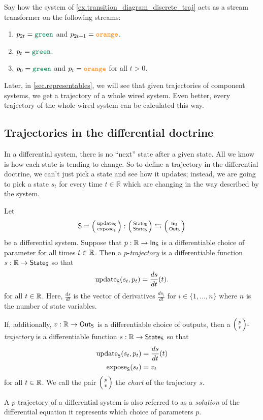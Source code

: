 \documentclass[DynamicalBook]{subfiles}
\begin{document}
\begin{exercise}
 Say how the system of \cref{ex.transition_diagram_discrete_traj} acts as a
 stream transformer on the following streams:
 \begin{enumerate}
   \item $p_{2t} = \Green$ and $p_{2t + 1} = {\color{orange} \mathtt{orange}}$.
   \item $p_t = \Green$.
   \item $p_0 = \Green$ and $p_t = {\color{orange} \mathtt{orange}}$ for
     all $t > 0$.
     \qedhere
 \end{enumerate}
\end{exercise}

Later, in \cref{sec.representables}, we will see that given trajectories of
component systems, we get a trajectory of a whole wired system. Even better,
every trajectory of the whole wired system can be calculated this way.

\subsection{Trajectories in the differential doctrine}\label{sec.trajectory_differential}

In a differential system, there is no ``next'' state after a given state. All we
know is how each state is tending to change. So to define a trajectory in the
differential doctrine, we can't just pick a state and see how it updates;
instead, we are going to pick a state $s_t$ for every time $t \in \mathbb{R}$
which are changing in the way described by the system. 

\begin{definition}
  Let
  $$\Sys{S} = \lens{\update{S}}{\expose{S}} : \lens{\State{S}}{\State{S}}
 \leftrightarrows \lens{\In{S}}{\Out{S}}$$
 be a differential system. Suppose that $p : \mathbb{R} \to \mathsf{In}_{\mathsf{S}}$ is a differentiable
 choice of parameter for all times $t \in \mathbb{R}$. Then a $p$-\emph{trajectory} is a
 differentiable
 function $s : \mathbb{R} \to \mathsf{State}_{\mathsf{S}}$ so that
 $$\mathrm{update}_{\mathsf{S}}(s_t, p_t) = \frac{ds}{dt}(t).$$
 for all $t \in \mathbb{R}$. Here, $\frac{ds}{dt}$ is the vector of derivatives
 $\frac{ds_i}{dt}$ for $i \in \{1, \ldots, n\}$ where $n$ is the number of state variables.

 If, additionally, $v : \mathbb{R} \to \mathsf{Out}_{\mathsf{S}}$ is a differentiable choice of outputs,
 then a $\lens{p}{v}$-\emph{trajectory} is a differentiable function $s : \mathbb{R}
 \to \mathsf{State}_{\mathsf{S}}$ so that
 \begin{align*}
   \mathrm{update}_{\mathsf{S}}(s_t, p_t) &= \frac{ds}{dt}(t) \\
   \mathrm{expose}_{\mathsf{S}}(s_t) &= v_t
 \end{align*}
 for all $t \in \mathbb{R}$. We call the pair $\lens{p}{v}$ the \emph{chart} of the
 trajectory $s$.
\end{definition}
\begin{remark}
  A $p$-trajectory of a differential system is also referred to as a \emph{solution}
  of the differential equation it represents which choice of parameters $p$.
\end{remark}
\end{document}
